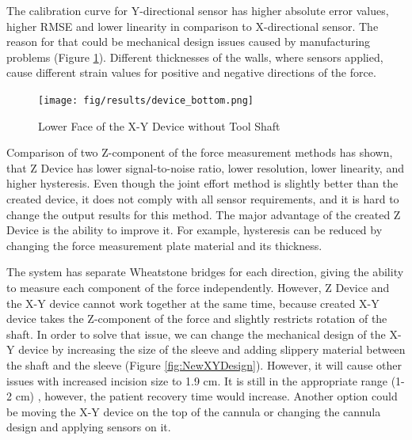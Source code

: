 The calibration curve for Y-directional sensor has higher absolute error values, higher RMSE and lower linearity in comparison to X-directional sensor. The reason for that could be mechanical design issues caused by manufacturing problems (Figure \ref{fig:Syst_err_expl}). Different thicknesses of the walls, where sensors applied, cause different strain values for positive and negative directions of the force.

\begin{figure}[h]
	\begin{center}
	\texttt{[image: fig/results/device\_bottom.png]}
	\end{center}
	\vspace{-4mm}
	\caption[Lower Face of the X-Y Device without Tool Shaft]
	{Lower Face of the X-Y Device without Tool Shaft}
	\label{fig:Syst_err_expl}
	\vspace{-2mm}
\end{figure}

	Comparison of two Z-component of the force measurement methods has shown, that Z Device has lower signal-to-noise ratio, lower resolution, lower linearity, and higher hysteresis. Even though the joint effort method is slightly better than the created device, it does not comply with all sensor requirements, and it is hard to change the output results for this method. The major advantage of the created Z Device is the ability to improve it. For example, hysteresis can be reduced by changing the force measurement plate material and its thickness.

The system has separate Wheatstone bridges for each direction, giving the ability to measure each component of the force independently. However, Z Device and the X-Y device cannot work together at the same time, because created X-Y device takes the Z-component of the force and slightly restricts rotation of the shaft. In order to solve that issue, we can change the mechanical design of the X-Y device by increasing the size of the sleeve and adding slippery material between the shaft and the sleeve (Figure \ref{fig:NewXYDesign}). However, it will cause other issues with increased incision size to 1.9 cm. It is still in the appropriate range (1-2 cm) \cite{_laparoscopy}, however, the patient recovery time would increase. Another option could be moving the X-Y device on the top of the cannula or changing the cannula design and applying sensors on it.

